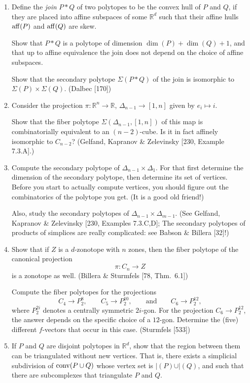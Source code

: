\documentclass{article}
\begin{document}
\begin{enumerate}
\item Define the \emph{join} $P*Q$ of two polytopes to be the convex hull of $P$ and $Q$, if they are placed into affine subspaces of some $\mathbb{R}^d$ such that their affine hulls $\operatorname{aff}(P)$ and $\operatorname{aff}(Q)$ are skew.

Show that $P*Q$ is a polytope of dimension $\dim(P)+\dim(Q)+1$, and that up to affine equivalence the join does not depend on the choice of affine subspaces.

Show that the secondary polytope $\Sigma(P*Q)$ of the join is isomorphic to $\Sigma(P)\times \Sigma(Q)$.
(Dalbec [170])

\item Consider the projection $\pi : \mathbb{R}^n \longrightarrow \mathbb{R}$, $\Delta_{n-1} \longrightarrow [1,n]$ given by $e_i \longmapsto i$.

Show that the fiber polytope $\Sigma(\Delta_{n-1},[1,n])$ of this map is combinatorially equivalent to an $(n-2)$-cube. Is it in fact affinely isomorphic to $C_{n-2}$?
(Gelfand, Kapranov \& Zelevinsky [230, Example 7.3.A].)

\item Compute the secondary polytope of $\Delta_{n-1}\times \Delta_1$. For that first determine the dimension of the secondary polytope, then determine its set of vertices. Before you start to actually compute vertices, you should figure out the combinatorics of the polytope you get. (It is a good old friend!)

Also, study the secondary polytopes of $\Delta_{n-1}\times \Delta_{m-1}$.
(See Gelfand, Kapranov \& Zelevinsky [230, Examples 7.3.C,D]; The secondary polytopes of products of simplices are really complicated: see Babson \& Billera [32]!)

\item Show that if $Z$ is a $d$-zonotope with $n$ zones, then the fiber polytope of the canonical projection
\[
\pi : C_n \longrightarrow Z
\]
is a zonotope as well.
(Billera \& Sturmfels [78, Thm.\ 6.1])

Compute the fiber polytopes for the projections
\[
C_4 \longrightarrow P_2^8, \qquad C_5 \longrightarrow P_2^{10}, \qquad \text{and} \qquad C_6 \longrightarrow P_2^{12},
\]
where $P_2^{2i}$ denotes a centrally symmetric $2i$-gon. For the projection $C_6 \longrightarrow P_2^{12}$, the answer depends on the specific choice of a $12$-gon. Determine the (five) different $f$-vectors that occur in this case.
(Sturmfels [533])

\item If $P$ and $Q$ are disjoint polytopes in $\mathbb{R}^d$, show that the region between them can be triangulated without new vertices. That is, there exists a simplicial subdivision of $\operatorname{conv}(P \cup Q)$ whose vertex set is $\vert(P)\cup \vert(Q)$, and such that there are subcomplexes that triangulate $P$ and $Q$.


\end{enumerate}
\end{document}
